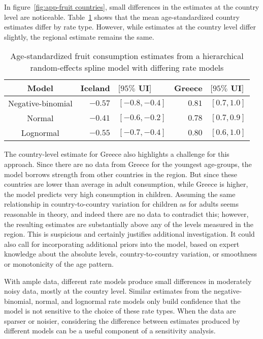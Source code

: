 In figure~\ref{fig:app-fruit countries},
small differences in the estimates at the country level are noticeable.
Table~\ref{tab:app-fruit rfx} shows that the mean age-standardized
country estimates differ by rate type.  However, while estimates at
the country level differ slightly, the regional estimate remains the same.

    \begin{table}[h]
        \begin{center}
        \begin{tabular}{|c|rl|rl|}
            \hline
                Model & Iceland&$[95\%$ UI$]$ & Greece&$[95\%$ UI$]$ \\
            \hline
                Negative-binomial & $-0.57$&$ [-0.8, -0.4]$ & $0.81$&$ [0.7, 1.0]$ \\
                Normal & $-0.41$&$ [-0.6, -0.2]$ & $0.78$&$ [0.7, 0.9]$ \\
                Lognormal & $-0.55$& $[-0.7, -0.4]$ & $0.80$&$ [0.6, 1.0]$ \\
            \hline
        \end{tabular}
        \end{center}
        \caption{ Age-standardized fruit consumption estimates
          from a hierarchical random-effects spline model with differing
          rate models}
        \label{tab:app-fruit rfx}
    \end{table}

The country-level estimate for Greece also highlights a challenge for
this approach.  Since there are no data from Greece for the youngest
age-groups, the model borrows strength from other countries in the
region.  But since these countries are lower than average in adult
consumption, while Greece is higher, the model predicts very high
consumption in children.  Assuming the same relationship in
country-to-country variation for children as for adults seems reasonable
in theory, and indeed there are no data to contradict this; however,
the resulting estimates are substantially above any of the levels
measured in the region.  This is suspicious and certainly justifies
additional investigation.  It could also call for incorporating
additional priors into the model, based on expert knowledge about the
absolute levels, country-to-country variation, or smoothness or
monotonicity of the age pattern.

With ample data, different rate models produce small differences in
moderately noisy data, mostly at the country level.  Similar estimates
from the negative-binomial, normal, and lognormal rate models only
build confidence that the model is not sensitive to the choice of these
rate types.  When the data are sparser or noisier, considering the
difference between estimates produced by different models can be a
useful component of a sensitivity analysis.
